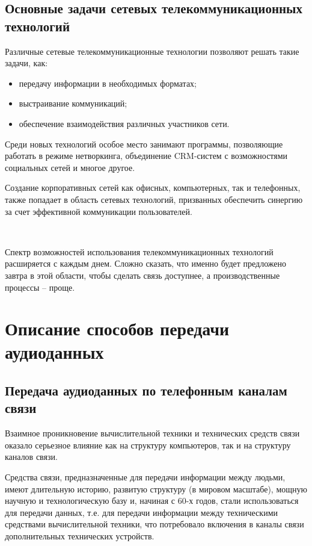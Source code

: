 \documentclass[a4paper]{report}
\begin{document}
\subsection{Основные задачи сетевых телекоммуникационных \\ технологий}
Различные сетевые телекоммуникационные технологии позволяют решать такие задачи, как:
\begin{itemize}
\item передачу информации в необходимых форматах;
\item выстраивание коммуникаций;
\item обеспечение взаимодействия различных участников сети.
\end{itemize}

Среди новых технологий особое место занимают программы, позволяющие работать в режиме нетворкинга, объединение CRM-систем с возможностями социальных сетей и многое другое.

Создание корпоративных сетей как офисных, компьютерных, так и телефонных, также попадает в область сетевых технологий, призванных обеспечить синергию за счет эффективной коммуникации пользователей.

~

Спектр возможностей использования телекоммуникационных технологий расширяется с каждым днем. Сложно сказать, что именно будет предложено завтра в этой области, чтобы сделать связь доступнее, а производственные процессы – проще.

\section{Описание способов передачи аудиоданных}
\subsection{Передача аудиоданных по телефонным каналам связи}

Взаимное проникновение вычислительной техники и технических средств связи оказало серьезное влияние как на структуру компьютеров, так и на структуру каналов связи.

Средства связи, предназначенные для передачи информации между людьми, имеют длительную историю, развитую структуру (в мировом масштабе), мощную научную и технологическую базу и, начиная с 60-х годов, стали использоваться для передачи данных, т.е. для передачи информации между техническими средствами вычислительной техники, что потребовало включения в каналы связи дополнительных технических устройств.
\end{document}
